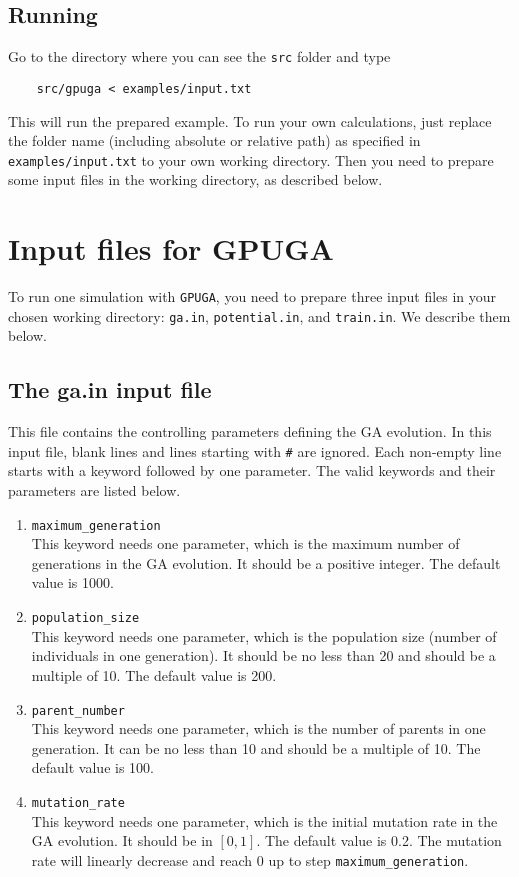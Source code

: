\documentclass[12pt,a4paper]{report}
\begin{document}
\subsection{Running}

Go to the directory where you can see the \verb"src" folder and type
\begin{verbatim}
    src/gpuga < examples/input.txt
\end{verbatim}
This will run the prepared example. To run your own calculations, just replace the folder name (including absolute or relative path) as specified in \verb"examples/input.txt" to your own working directory. Then you need to prepare some input files in the working directory, as described below.

\section{Input files for GPUGA}

To run one simulation with \verb"GPUGA", you need to prepare three input files in your chosen working directory: \verb"ga.in", \verb"potential.in", and \verb"train.in". We describe them below.

\subsection{The ga.in input file}

This file contains the controlling parameters defining the GA evolution. In this input file, blank lines and lines starting with \verb"#" are ignored. Each non-empty line starts with a keyword followed by one parameter.  The valid keywords and their parameters are listed below.
\begin{enumerate}
\item  \verb"maximum_generation"\\
This keyword needs one parameter, which is the maximum number of generations in the GA evolution. It should be a positive integer. The default value is 1000.
\item  \verb"population_size" \\
This keyword needs one parameter, which is the population size (number of individuals in one generation). It should be no less than 20 and should be a multiple of 10. The default value is 200.
\item  \verb"parent_number"\\
This keyword needs one parameter, which is the number of parents in one generation. It can be no less than 10 and should be a multiple of 10. The default value is 100.
\item  \verb"mutation_rate"\\
This keyword needs one parameter, which is the initial mutation rate in the GA evolution. It should be in $[0,1]$. The default value is 0.2. The mutation rate will linearly decrease and reach 0 up to step \verb"maximum_generation".
\end{enumerate}
\end{document}

